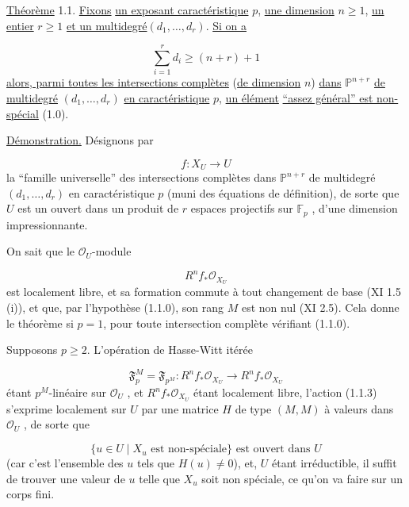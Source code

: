 \underline{Théorème} 1.1. \underline{Fixons} \underline{un exposant caractéristique} $p$, \underline{une dimension} $n \geq 1$, \underline{un entier} $r \geq 1$ \underline{et un multidegré}$(d_1,\dots,d_r)$. \underline{Si on a}

\begin{equation}\tag{1.1.0}
\sum_{i=1}^{r} d_i \geq (n+r)+1
\end{equation}
\underline{alors, parmi toutes les intersections complètes} (\underline{de dimension} $n$) \underline{dans} $\mathbb{P}^{n+r}$ \underline{de multidegré} $(d_1,\dots,d_r)$ \underline{en caractéristique} $p$, \underline{un élément} \underline{``assez général'' est non-spécial} (1.0).

\underline{Démonstration.} Désignons par

\begin{equation}\tag{1.1.1}
f : X_U \longrightarrow U
\end{equation}
la ``famille universelle'' des intersections complètes dans $\mathbb{P}^{n+r}$ de
multidegré $(d_1,\dots,d_r)$ en caractéristique $p$ (muni des équations de définition), de sorte que $U$ est un ouvert dans un produit de $r$ espaces projectifs sur $\mathbb{F}_p$ , d'une dimension impressionnante.

On sait que le $\mathcal{O}_U$-module

\begin{equation}\tag{1.1.2}
R^n f_* \mathcal{O}_{X_U}
\end{equation}
est localement libre, et sa formation commute à tout changement de base (XI 1.5 (i)), et que, par l'hypothèse (1.1.0), son rang $M$ est non nul (XI 2.5). Cela donne le théorème si $p = 1$, pour toute intersection complète vérifiant (1.1.0).

Supposons $p \geq 2$. L'opération de Hasse-Witt itérée

\begin{equation}\tag{1.1.3}
\mathfrak{F}_p^M = \mathfrak{F}_{p^M} : R^n f_* \mathcal{O}_{X_U} \longrightarrow R^n f_* \mathcal{O}_{X_U}
\end{equation}
étant $p^M$-linéaire sur $\mathcal{O}_U$ , et $R^n f_* \mathcal{O}_{X_U}$ étant localement libre, l'action (1.1.3) s'exprime localement sur $U$ par une matrice $H$ de type $(M,M)$ à valeurs dans $\mathcal{O}_U$ , de sorte que

\begin{equation}\tag{1.1.4}
\{ u \in U \mid X_u \mbox{ est non-spéciale}\} \mbox{ est ouvert dans } U
\end{equation}
(car c'est l'ensemble des $u$ tels que $H(u) \neq 0$), et, $U$ étant irréductible, il suffit de trouver une valeur de $u$ telle que $X_u$ soit non spéciale, ce qu'on va faire sur un corps fini.

